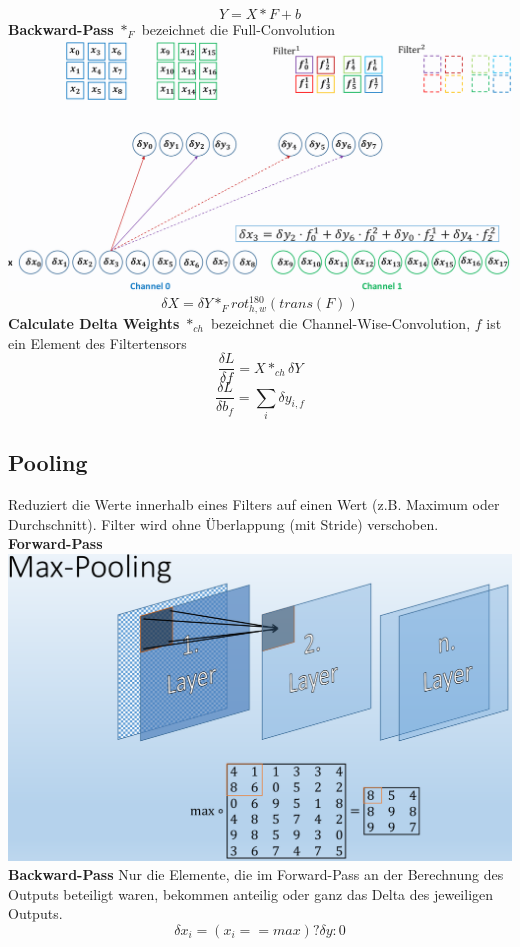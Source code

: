 \documentclass[12pt]{article}
\begin{document}
	$$Y = X * F + b$$
	\textbf{Backward-Pass} $*_F$ bezeichnet die Full-Convolution\\
	\includegraphics[width=\linewidth]{figures/convolution-backward.png}
	$$\delta X = \delta Y *_F rot^{180}_{h,w}(trans(F))$$
	\textbf{Calculate Delta Weights} $*_{ch}$ bezeichnet die Channel-Wise-Convolution, $f$ ist ein Element des Filtertensors
	$$\frac{\delta L}{\delta f} = X *_{ch} \delta Y$$
	$$\frac{\delta L}{\delta b_f} = \sum_i \delta y_{i,f}$$
	\subsection{Pooling}
	Reduziert die Werte innerhalb eines Filters auf einen Wert (z.B. Maximum oder Durchschnitt). Filter wird ohne Überlappung (mit Stride) verschoben.\\
	\textbf{Forward-Pass}\\
	\includegraphics[width=\linewidth]{figures/max-pooling.png}\\
	\textbf{Backward-Pass} Nur die Elemente, die im Forward-Pass an der Berechnung des Outputs beteiligt waren, bekommen anteilig oder ganz das Delta des jeweiligen Outputs.
	$$\delta x_i = (x_i == max) ? \delta y : 0$$
\end{document}
